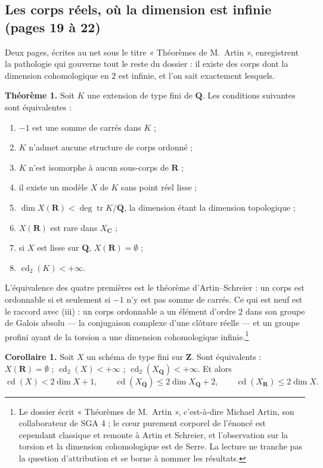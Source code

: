 \documentclass[11pt,a4paper]{article}
\begin{document}
\subsection*{Les corps réels, où la dimension est infinie (pages 19 à 22)}

Deux pages, écrites au net sous le titre « Théorèmes de M.\ Artin », enregistrent
la pathologie qui gouverne tout le reste du dossier : il existe des corps dont
la dimension cohomologique en $2$ est infinie, et l'on sait exactement
lesquels.

\textbf{Théorème 1.} Soit $K$ une extension de type fini de $\mathbf{Q}$. Les
conditions suivantes sont équivalentes :
\begin{enumerate}
\item[(i)] $-1$ est une somme de carrés dans $K$ ;
\item[(i bis)] $K$ n'admet aucune structure de corps ordonné ;
\item[(i ter)] $K$ n'est isomorphe à aucun sous-corps de $\mathbf{R}$ ;
\item[(ii)] il existe un modèle $X$ de $K$ sans point réel lisse ;
\item[(ii bis)] $\dim X(\mathbf{R}) < \deg\operatorname{tr} K/\mathbf{Q}$,
la dimension étant la dimension topologique ;
\item[(ii ter)] $X(\mathbf{R})$ est rare dans $X_{\mathbf{C}}$ ;
\item[(ii quater)] si $X$ est lisse sur $\mathbf{Q}$, $X(\mathbf{R}) =
\emptyset$ ;
\item[(iii)] $\operatorname{cd}_2(K) < +\infty$.
\end{enumerate}

L'équivalence des quatre premières est le théorème d'Artin--Schreier : un corps
est ordonnable si et seulement si $-1$ n'y est pas somme de carrés. Ce qui est
neuf est le raccord avec (iii) : un corps ordonnable a un élément d'ordre $2$
dans son groupe de Galois absolu — la conjugaison complexe d'une clôture
réelle — et un groupe profini ayant de la torsion a une dimension cohomologique
infinie.\footnote{Le dossier écrit « Théorèmes de M.\ Artin », c'est-à-dire
Michael Artin, son collaborateur de SGA 4 ; le cœur purement corporel de
l'énoncé est cependant classique et remonte à Artin et Schreier, et
l'observation sur la torsion et la dimension cohomologique est de Serre. La
lecture ne tranche pas la question d'attribution et se borne à nommer les
résultats.}

\textbf{Corollaire 1.} Soit $X$ un schéma de type fini sur $\mathbf{Z}$. Sont
équivalents : $X(\mathbf{R}) = \emptyset$ ; $\operatorname{cd}_2(X) < +\infty$ ;
$\operatorname{cd}_2(X_{\mathbf{Q}}) < +\infty$. Et alors
\[
\operatorname{cd}(X) < 2\dim X + 1, \qquad
\operatorname{cd}(X_{\mathbf{Q}}) \leqslant 2\dim X_{\mathbf{Q}} + 2, \qquad
\operatorname{cd}(X_{\mathbf{R}}) \leqslant 2\dim X.
\]
\end{document}
